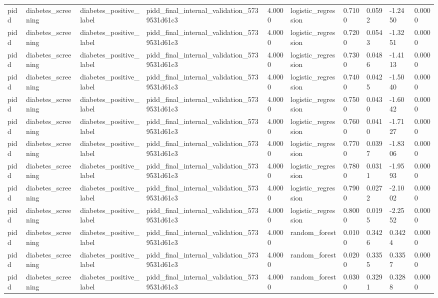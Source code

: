\begin{tabular}{llllllllll}
pidd & diabetes\_screening & diabetes\_positive\_label & pidd\_final\_internal\_validation\_5739531d61c3 & 4.0000 & logistic\_regression & 0.7100 & 0.0592 & -1.2450 & 0.0000 \\
pidd & diabetes\_screening & diabetes\_positive\_label & pidd\_final\_internal\_validation\_5739531d61c3 & 4.0000 & logistic\_regression & 0.7200 & 0.0543 & -1.3251 & 0.0000 \\
pidd & diabetes\_screening & diabetes\_positive\_label & pidd\_final\_internal\_validation\_5739531d61c3 & 4.0000 & logistic\_regression & 0.7300 & 0.0486 & -1.4113 & 0.0000 \\
pidd & diabetes\_screening & diabetes\_positive\_label & pidd\_final\_internal\_validation\_5739531d61c3 & 4.0000 & logistic\_regression & 0.7400 & 0.0425 & -1.5040 & 0.0000 \\
pidd & diabetes\_screening & diabetes\_positive\_label & pidd\_final\_internal\_validation\_5739531d61c3 & 4.0000 & logistic\_regression & 0.7500 & 0.0430 & -1.6042 & 0.0000 \\
pidd & diabetes\_screening & diabetes\_positive\_label & pidd\_final\_internal\_validation\_5739531d61c3 & 4.0000 & logistic\_regression & 0.7600 & 0.0410 & -1.7127 & 0.0000 \\
pidd & diabetes\_screening & diabetes\_positive\_label & pidd\_final\_internal\_validation\_5739531d61c3 & 4.0000 & logistic\_regression & 0.7700 & 0.0397 & -1.8306 & 0.0000 \\
pidd & diabetes\_screening & diabetes\_positive\_label & pidd\_final\_internal\_validation\_5739531d61c3 & 4.0000 & logistic\_regression & 0.7800 & 0.0311 & -1.9593 & 0.0000 \\
pidd & diabetes\_screening & diabetes\_positive\_label & pidd\_final\_internal\_validation\_5739531d61c3 & 4.0000 & logistic\_regression & 0.7900 & 0.0272 & -2.1002 & 0.0000 \\
pidd & diabetes\_screening & diabetes\_positive\_label & pidd\_final\_internal\_validation\_5739531d61c3 & 4.0000 & logistic\_regression & 0.8000 & 0.0195 & -2.2552 & 0.0000 \\
pidd & diabetes\_screening & diabetes\_positive\_label & pidd\_final\_internal\_validation\_5739531d61c3 & 4.0000 & random\_forest & 0.0100 & 0.3426 & 0.3424 & 0.0000 \\
pidd & diabetes\_screening & diabetes\_positive\_label & pidd\_final\_internal\_validation\_5739531d61c3 & 4.0000 & random\_forest & 0.0200 & 0.3355 & 0.3357 & 0.0000 \\
pidd & diabetes\_screening & diabetes\_positive\_label & pidd\_final\_internal\_validation\_5739531d61c3 & 4.0000 & random\_forest & 0.0300 & 0.3291 & 0.3288 & 0.0000 \\

\end{tabular}
